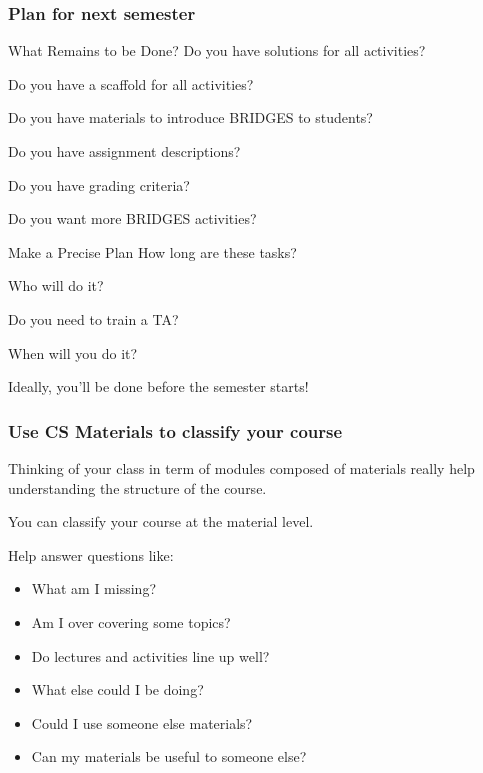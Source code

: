 \documentclass[aspectratio=169]{beamer}
\begin{document}
\begin{frame}
  \frametitle{Plan for next semester}

  \begin{block}{What Remains to be Done?}
    Do you have solutions for all activities?

    Do you have a scaffold for all activities?

    Do you have materials to introduce BRIDGES to students?

    Do you have assignment descriptions?

    Do you have grading criteria?
    
    Do you want more BRIDGES activities?
  \end{block}

  \begin{block}{Make a Precise Plan}
    How long are these tasks?
    
    Who will do it?

    Do you need to train a TA?

    When will you do it?

    Ideally, you'll be done before the semester starts!
  \end{block}
\end{frame}


\begin{frame}
  \frametitle{Use CS Materials to classify your course}

  Thinking of your class in term of modules composed of materials really help understanding the structure of the course.

  You can classify your course at the material level.

  Help answer questions like:
  \begin{itemize}
  \item What am I missing?
  \item Am I over covering some topics?
  \item Do lectures and activities line up well?
  \item What else could I be doing?
  \item Could I use someone else materials?
  \item Can my materials be useful to someone else?
  \end{itemize}
\end{frame}
\end{document}
